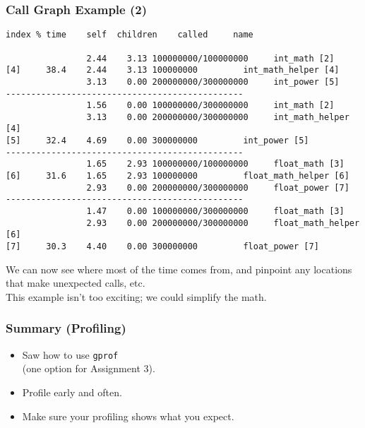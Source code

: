\documentclass[aspectratio=43]{beamer}
\newenvironment{changemargin}[1]{%
  \begin{list}{}{%
    \setlength{\topsep}{0pt}%
    \setlength{\leftmargin}{#1}%
    \setlength{\rightmargin}{1em}
    \setlength{\listparindent}{\parindent}%
    \setlength{\itemindent}{\parindent}%
    \setlength{\parsep}{\parskip}%
  }%
  \item[]}{\end{list}}
\begin{document}
\begin{frame}[fragile]
  \frametitle{Call Graph Example (2)}

  \begin{changemargin}{1cm}
  \begin{lstlisting}[basicstyle=\tiny]
index % time    self  children    called     name

                2.44    3.13 100000000/100000000     int_math [2]
[4]     38.4    2.44    3.13 100000000         int_math_helper [4]
                3.13    0.00 200000000/300000000     int_power [5]
-----------------------------------------------
                1.56    0.00 100000000/300000000     int_math [2]
                3.13    0.00 200000000/300000000     int_math_helper [4]
[5]     32.4    4.69    0.00 300000000         int_power [5]
-----------------------------------------------
                1.65    2.93 100000000/100000000     float_math [3]
[6]     31.6    1.65    2.93 100000000         float_math_helper [6]
                2.93    0.00 200000000/300000000     float_power [7]
-----------------------------------------------
                1.47    0.00 100000000/300000000     float_math [3]
                2.93    0.00 200000000/300000000     float_math_helper [6]
[7]     30.3    4.40    0.00 300000000         float_power [7]
  \end{lstlisting}

  
 We can now see where most of the time comes from, and pinpoint any
      locations that make unexpected calls, etc.\\[1em]
 This example isn't too exciting; we could simplify the math.
  \end{changemargin}
\end{frame}

\begin{frame}
  \frametitle{Summary (Profiling)}

  \begin{changemargin}{1cm}
  \begin{itemize}
    \item Saw how to use {\tt gprof} \\ \qquad (one option for Assignment 3).
    \item Profile early and often.
    \item Make sure your profiling shows what you expect. 
  \end{itemize}
  \end{changemargin}
\end{frame}
\end{document}
